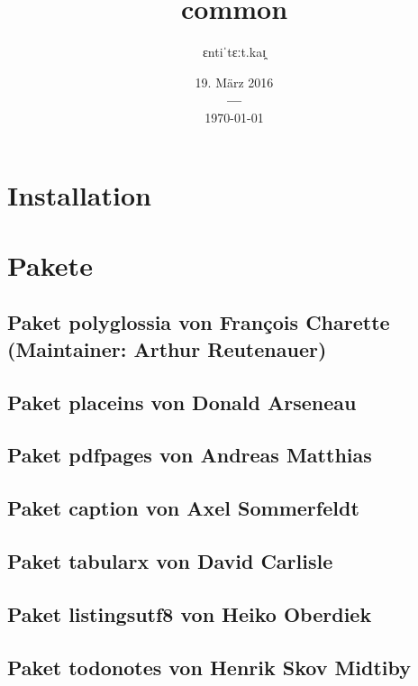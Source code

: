 \documentclass[a4paper,12pt]{article}
\title{\fontspec{Times New Roman}common}
\author{\fontspec{Times New Roman}ɛntiˈtɛːt.kaɪ̯}
\date{%
			{\fontspec{Times New Roman}19. März 2016} \\
			{\bf---} \\[0.2\baselineskip]
			\fontspec{Times New Roman}\today}
\begin{document}
		\listoftodos

		

		\maketitle


		\tableofcontents  %

		\chapter{Installation}
		\chapter{Pakete}
			\section{Paket polyglossia von François Charette (Maintainer: Arthur
				Reutenauer)}
				
			\section{Paket placeins von Donald Arseneau}
				
			\section{Paket pdfpages von Andreas Matthias}
				
			\section{Paket caption von Axel Sommerfeldt}
				
			\section{Paket tabularx von David Carlisle}
				
			\section{Paket listingsutf8 von Heiko Oberdiek}
				
			\section{Paket todonotes von Henrik Skov Midtiby}
				
\end{document}
